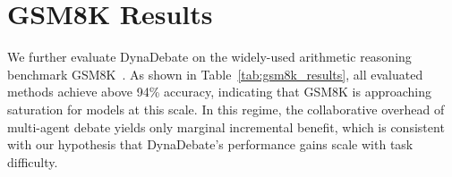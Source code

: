 \section{GSM8K Results}
\label{app:gsm8k}

We further evaluate DynaDebate on the widely-used arithmetic reasoning benchmark GSM8K~\cite{cobbe2021gsm8k}.
As shown in Table~\ref{tab:gsm8k_results}, all evaluated methods achieve above 94\% accuracy, indicating that GSM8K is approaching saturation for models at this scale.
In this regime, the collaborative overhead of multi-agent debate yields only marginal incremental benefit, which is consistent with our hypothesis that DynaDebate's performance gains scale with task difficulty.

\begin{table}[h]
\centering
{}
\end{table}
